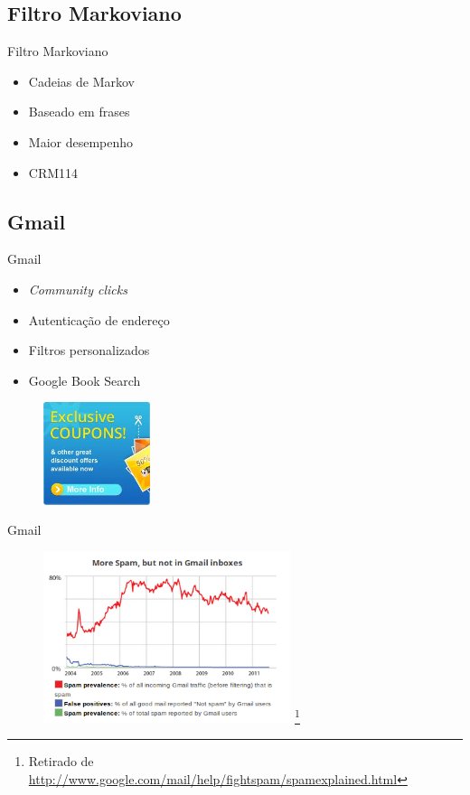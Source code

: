 \documentclass[dvipdfm]{beamer}
\begin{document}
\subsection{Filtro Markoviano}
\begin{frame}{Filtro Markoviano}
	\begin{itemize}
		\item Cadeias de Markov
		\item Baseado em frases
		\item Maior desempenho
		\item CRM114
	\end{itemize}
\end{frame}

\subsection{Gmail}
\begin{frame}{Gmail}
	\begin{itemize}
		\item \emph{Community clicks}
		\item Autenticação de endereço
		\item Filtros personalizados
		\item Google Book Search
	\end{itemize}
	\begin{figure}
		\centering
		\includegraphics[height=3cm]{Imagens/spam/spamimagem.jpg}
	\end{figure}	
\end{frame}

\begin{frame}{Gmail}
	\begin{figure}
		\includegraphics[height=5cm]{Imagens/gmail/spamchart.png} \footnote{Retirado de \url{http://www.google.com/mail/help/fightspam/spamexplained.html}}
	\end{figure}
\end{frame}
\end{document}
